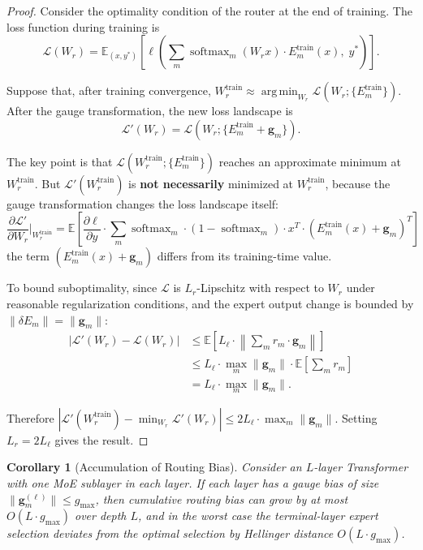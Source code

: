 \documentclass[12pt,a4paper]{article}
\newtheorem{corollary}[theorem]{Corollary}
\theoremstyle{remark}
\newcommand{\E}{\mathbb{E}}
\newcommand{\loss}{\mathcal{L}}
\DeclareMathOperator{\argmin}{arg\,min}
\DeclareMathOperator{\softmax}{softmax}
\begin{document}
\begin{proof}
Consider the optimality condition of the router at the end of training. The loss function during training is
\begin{equation}
    \loss(W_r) = \E_{(x, y^*)} \left[ \ell\left( \sum_{m} \softmax_m(W_r x) \cdot E_m^{\text{train}}(x), \; y^* \right) \right].
\end{equation}

Suppose that, after training convergence, $W_r^{\text{train}} \approx \argmin_{W_r} \loss(W_r; \{E_m^{\text{train}}\})$. After the gauge transformation, the new loss landscape is
\begin{equation}
    \loss'(W_r) = \loss(W_r; \{E_m^{\text{train}} + \mathbf{g}_m\}).
\end{equation}

The key point is that $\loss(W_r^{\text{train}}; \{E_m^{\text{train}}\})$ reaches an approximate minimum at $W_r^{\text{train}}$. But $\loss'(W_r^{\text{train}})$ is \textbf{not necessarily} minimized at $W_r^{\text{train}}$, because the gauge transformation changes the loss landscape itself:
\begin{equation}
    \frac{\partial \loss'}{\partial W_r}\bigg|_{W_r^{\text{train}}} = \E\left[ \frac{\partial \ell}{\partial y} \cdot \sum_m \softmax_m \cdot (1 - \softmax_m) \cdot x^T \cdot (E_m^{\text{train}}(x) + \mathbf{g}_m)^T \right]
\end{equation}
the term $(E_m^{\text{train}}(x) + \mathbf{g}_m)$ differs from its training-time value.

To bound suboptimality, since $\loss$ is $L_r$-Lipschitz with respect to $W_r$ under reasonable regularization conditions, and the expert output change is bounded by $\|\delta E_m\| = \|\mathbf{g}_m\|$:
\begin{align}
    |\loss'(W_r) - \loss(W_r)| &\leq \E\left[ L_\ell \cdot \left\|\sum_m r_m \cdot \mathbf{g}_m\right\| \right] \\
    &\leq L_\ell \cdot \max_m \|\mathbf{g}_m\| \cdot \E\left[\sum_m r_m\right] \\
    &= L_\ell \cdot \max_m \|\mathbf{g}_m\|.
\end{align}

Therefore $|\loss'(W_r^{\text{train}}) - \min_{W_r} \loss'(W_r)| \leq 2 L_\ell \cdot \max_m \|\mathbf{g}_m\|$. Setting $L_r = 2L_\ell$ gives the result.
\end{proof}

\begin{corollary}[Accumulation of Routing Bias]\label{cor:cumulative}
Consider an $L$-layer Transformer with one MoE sublayer in each layer. If each layer has a gauge bias of size $\|\mathbf{g}_m^{(\ell)}\| \leq g_{\max}$, then cumulative routing bias can grow by at most $O(L \cdot g_{\max})$ over depth $L$, and in the worst case the terminal-layer expert selection deviates from the optimal selection by Hellinger distance $O(L \cdot g_{\max})$.
\end{corollary}
\end{document}
